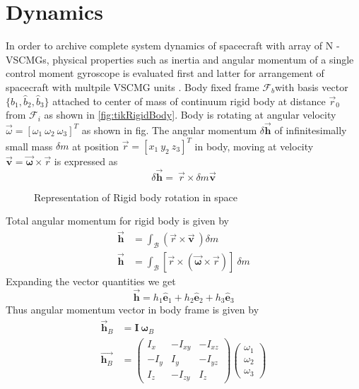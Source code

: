 \section{Dynamics}
In order to archive complete system dynamics of spacecraft with array of N - VSCMGs, physical properties such as inertia and angular momentum of a single control moment gyroscope is evaluated first and latter for arrangement of spacecraft with multpile VSCMG units . Body fixed frame $\displaystyle \mathcal{F}_{b}$with basis vector $\displaystyle \{\hat{b}_{1} ,\hat{b}_{2} ,\hat{b}_{3}\}$ attached to center of mass of continuum rigid body at distance $\displaystyle \vec{r}_{0}$ from $\displaystyle \mathcal{F}_{i}$ as shown in \autoref{fig:tikRigidBody}. Body is rotating at angular velocity $\displaystyle \vec{\omega } =[ \omega _{1} \ \omega _{2} \ \omega _{3}]^{T}$ as shown in fig. The angular momentum $\displaystyle \delta \vec{\mathbf{h}}$ of infinitesimally small mass $\displaystyle \delta m$ at position $\displaystyle \vec{r} =[ x_{1} \ y_{2} \ z_{3}]^{T}$ in body, moving at velocity $\displaystyle \mathbf{\vec{v}} =\vec{\mathbf{\omega }} \times \vec{r}$ is expressed as
\begin{equation*}
\delta \vec{\mathbf{h}} =\ \vec{r} \times \delta m\mathbf{\vec{v}}
\end{equation*}
\begin{figure}[!ht]
    \centering
    
    \caption{Representation of Rigid body rotation in space}
    \label{fig:tikRigidBody}
\end{figure}
Total angular momentum for rigid body is given by
\begin{equation*}
\begin{aligned}
\vec{\mathbf{h}} & =\int _{\mathcal{B}}(\vec{r} \times \mathbf{\vec{v}} \ ) \delta m\\
\vec{\mathbf{h}} & =\int _{\mathcal{B}}[\vec{r} \times (\vec{\mathbf{\omega }} \times \vec{r})] \ \delta m
\end{aligned}
\end{equation*}
Expanding the vector quantities we get
\begin{equation*}
\vec{\mathbf{h}} =h_{1}\hat{\mathbf{e}}_{1} +h_{2}\hat{\mathbf{e}}_{2} +h_{3}\hat{\mathbf{e}}_{3}
\end{equation*}
Thus angular momentum vector in body frame is given by
\begin{equation}
\begin{aligned}
\vec{\mathbf{h}}_{B} & =\mathbf{I\ \omega }_{B}\\
\overrightarrow{\mathbf{h}_{B}} & =\begin{pmatrix}
I_{x} & -I_{xy} & -I_{xz}\\
-I_{y} & I_{y} & -I_{yz}\\
I_{z} & -I_{zy} & I_{z}
\end{pmatrix}\begin{pmatrix}
\omega _{1}\\
\omega _{2}\\
\omega _{3}
\end{pmatrix}
\end{aligned}
\end{equation}
